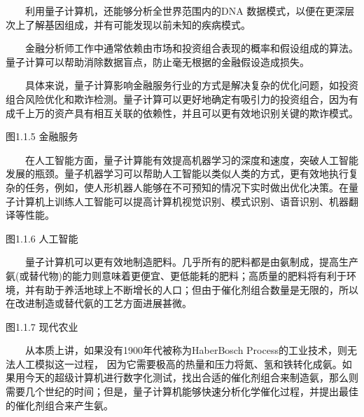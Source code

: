 \documentclass[a4paper,11pt,english]{sphinxmanual}
\begin{document}
\sphinxAtStartPar
  利用量子计算机，还能够分析全世界范围内的DNA 数据模式，以便在更深层次上了解基因组成，并有可能发现以前未知的疾病模式。

\sphinxAtStartPar
{}

\sphinxAtStartPar
  金融分析师工作中通常依赖由市场和投资组合表现的概率和假设组成的算法。量子计算可以帮助消除数据盲点，防止毫无根据的金融假设造成损失。

\sphinxAtStartPar
  具体来说，量子计算影响金融服务行业的方式是解决复杂的优化问题，如投资组合风险优化和欺诈检测。量子计算可以更好地确定有吸引力的投资组合，因为有成千上万的资产具有相互关联的依赖性，并且可以更有效地识别关键的欺诈模式。


\begin{center}图1.1.5 金融服务
\end{center}
\sphinxAtStartPar
{}

\sphinxAtStartPar
  在人工智能方面，量子计算能有效提高机器学习的深度和速度，突破人工智能发展的瓶颈。量子机器学习可以帮助人工智能以类似人类的方式，更有效地执行复杂的任务，例如，使人形机器人能够在不可预知的情况下实时做出优化决策。在量子计算机上训练人工智能可以提高计算机视觉识别、模式识别、语音识别、机器翻译等性能。


\begin{center}图1.1.6 人工智能
\end{center}
\sphinxAtStartPar
{}

\sphinxAtStartPar
  量子计算机可以更有效地制造肥料。几乎所有的肥料都是由氨制成，提高生产氨(或替代物)的能力则意味着更便宜、更低能耗的肥料；高质量的肥料将有利于环境，并有助于养活地球上不断增长的人口；但由于催化剂组合数量是无限的，所以在改进制造或替代氨的工艺方面进展甚微。


\begin{center}图1.1.7 现代农业
\end{center}
\sphinxAtStartPar
  从本质上讲，如果没有1900年代被称为Haber\sphinxhyphen{}Bosch Process的工业技术，则无法人工模拟这一过程， 因为它需要极高的热量和压力将氮、氢和铁转化成氨。如果用今天的超级计算机进行数字化测试，找出合适的催化剂组合来制造氨，那么则需要几个世纪的时间；但是，量子计算机能够快速分析化学催化过程，并提出最佳的催化剂组合来产生氨。
\end{document}
